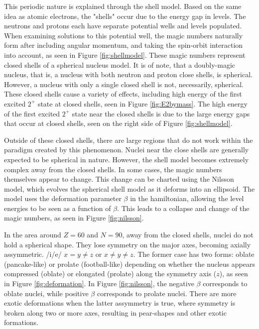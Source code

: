 This periodic nature is explained through the shell model. Based on the same idea as atomic electrons, the "shells" occur due to the energy gap in levels. The neutrons and protons each have separate potential wells and levels populated. When examining solutions to this potential well, the magic numbers naturally form after including angular momentum, and taking the spin-orbit interaction into account, as seen in Figure \ref{fig:shellmodel}. These magic numbers represent closed shells of a spherical nucleus model. It is of note, that a doubly-magic nucleus, that is, a nucleus with both neutron and proton close shells, is spherical. However, a nucleus with only a single closed shell is not, necessarily, spherical. These closed shells cause a variety of effects, including high energy of the first excited $2^+$ state at closed shells, seen in Figure \ref{fig:E2bymass}. The high energy of the first excited $2^+$ state near the closed shells is due to the large energy gaps that occur at closed shells, seen on the right side of Figure \ref{fig:shellmodel}.





% 

Outside of these closed shells, there are large regions that do not work within the paradigm created by this phenomenon. Nuclei near the close shells are generally expected to be spherical in nature. However, the shell model becomes extremely complex away from the closed shells. In some cases, the magic numbers themselves appear to change. This change can be charted using the Nilsson model, which evolves the spherical shell model as it deforms into an ellipsoid. The model uses the deformation parameter $\beta$ in the hamiltonian, allowing the level energies to be seen as a function of $\beta$. This leads to a collapse and change of the magic numbers, as seen in Figure \ref{fig:nilsson}.



In the area around $Z=60$ and $N=90$, away from the closed shells, nuclei do not hold a spherical shape. They lose symmetry on the major axes, becoming axially assymmetric. /i/e/ $x=y\neq z$ or $x \neq y \neq z$. The former case has two forms: oblate (pancake-like) or prolate (football-like) depending on whether the nucleus appears compressed (oblate) or elongated (prolate) along the symmetry axis ($z$), as seen in Figure \ref{fig:deformation}. In Figure \ref{fig:nilsson}, the negative $\beta$ corresponds to oblate nuclei, while positive $\beta$ corresponds to prolate nuclei. There are more exotic deformations when the latter assymmetry is true, where symmetry is broken along two or more axes, resulting in pear-shapes and other exotic formations.

